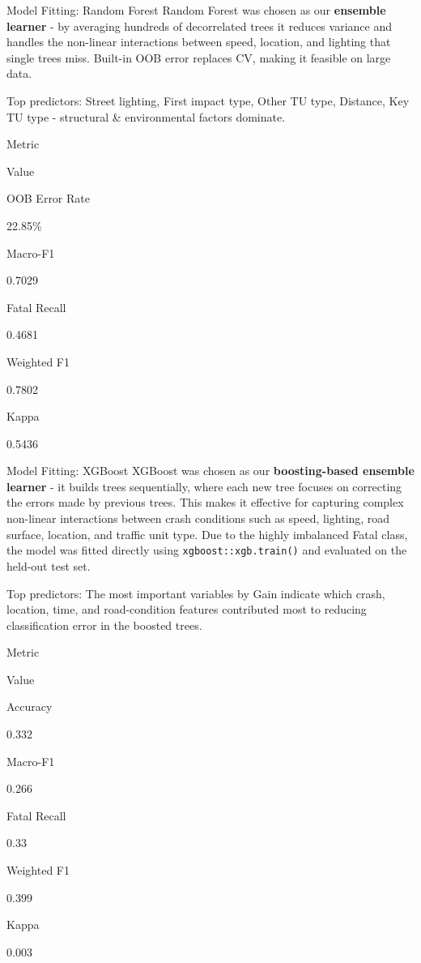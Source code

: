 \documentclass[
  ignorenonframetext,
]{beamer}
\begin{document}
\begin{frame}{Model Fitting: Random Forest}
\label{model-fitting-random-forest}
Random Forest was chosen as our \textbf{ensemble learner} - by averaging
hundreds of decorrelated trees it reduces variance and handles the
non-linear interactions between speed, location, and lighting that
single trees miss. Built-in OOB error replaces CV, making it feasible on
large data.

Top predictors: Street lighting, First impact type, Other TU type,
Distance, Key TU type - structural \& environmental factors dominate.

Metric

Value

OOB Error Rate

22.85\%

Macro-F1

0.7029

Fatal Recall

0.4681

Weighted F1

0.7802

Kappa

0.5436
\end{frame}

\begin{frame}[fragile]{Model Fitting: XGBoost}
\label{model-fitting-xgboost}
XGBoost was chosen as our \textbf{boosting-based ensemble learner} - it
builds trees sequentially, where each new tree focuses on correcting the
errors made by previous trees. This makes it effective for capturing
complex non-linear interactions between crash conditions such as speed,
lighting, road surface, location, and traffic unit type. Due to the
highly imbalanced Fatal class, the model was fitted directly using
\texttt{xgboost::xgb.train()} and evaluated on the held-out test set.

Top predictors: The most important variables by Gain indicate which
crash, location, time, and road-condition features contributed most to
reducing classification error in the boosted trees.

Metric

Value

Accuracy

0.332

Macro-F1

0.266

Fatal Recall

0.33

Weighted F1

0.399

Kappa

0.003
\end{frame}
\end{document}

